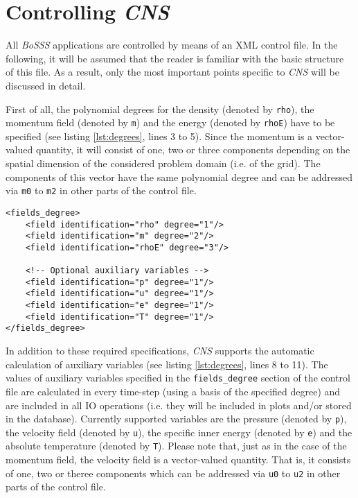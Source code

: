 \section{Controlling \emph{CNS}}
\label{sec:usage}

All \emph{BoSSS} applications are controlled by means of an XML control file.
In the following, it will be assumed that the reader is familiar with the basic
structure of this file. As a result, only the most important points specific to
\emph{CNS} will be discussed in detail.

First of all, the polynomial degrees for the density (denoted by \texttt{rho}),
the momentum field (denoted by \texttt{m}) and the energy (denoted by
\texttt{rhoE}) have to be specified (see listing \ref{lst:degrees}, lines 3 to 5).
Since the momentum is a vector-valued quantity, it will consist of
one, two or three components depending on the spatial dimension of the considered
problem domain (i.e. of the grid). The components of this vector have the same
polynomial degree and can be addressed via \texttt{m0} to \texttt{m2} in other
parts of the control file.

\begin{lstlisting}[caption={Specification of the polynomial degrees}, 
label={lst:degrees}]
<fields_degree>
	<field identification="rho" degree="1"/>
	<field identification="m" degree="2"/>
	<field identification="rhoE" degree="3"/>
	
	<!-- Optional auxiliary variables -->
	<field identification="p" degree="1"/>
	<field identification="u" degree="1"/>
	<field identification="e" degree="1"/>
	<field identification="T" degree="1"/>
</fields_degree>
\end{lstlisting}

In addition to these required specifications, \emph{CNS} supports the
automatic calculation of auxiliary variables (see listing \ref{lst:degrees},
lines 8 to 11). The values of auxiliary variables specified in the
\texttt{fields\_degree} section of the control file are calculated in every
time-step (using a basis of the specified degree) and are included in all IO
operations (i.e. they will be included in plots and/or stored in the database).
Currently supported variables are the pressure (denoted by \texttt{p}), the
velocity field (denoted by \texttt{u}), the specific inner energy (denoted by
\texttt{e}) and the absolute temperature (denoted by \texttt{T}). Please note
that, just as in the case of the momentum field, the velocity field is a
vector-valued quantity. That is, it consists of one, two or theree components
which can be addressed via \texttt{u0} to \texttt{u2} in other parts of the
control file.

